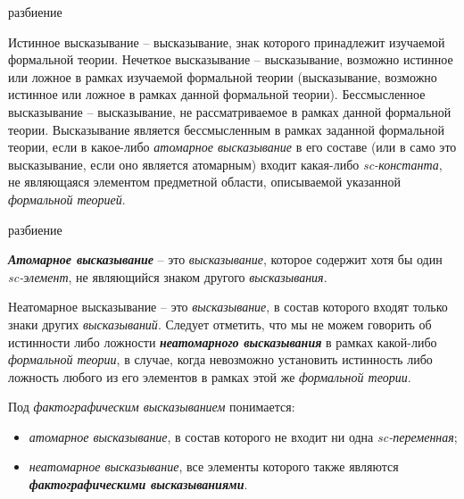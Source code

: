 \begin{SCn}
\begin{scnrelfromset}{разбиение}
\end{scnrelfromset}
\end{SCn}

Истинное высказывание -- высказывание, знак которого принадлежит изучаемой формальной теории.
Нечеткое высказывание -- высказывание, возможно истинное или ложное в рамках изучаемой формальной теории (высказывание, возможно истинное или ложное в рамках данной формальной теории).
Бессмысленное высказывание -- высказывание, не рассматриваемое в рамках данной формальной теории. Высказывание является бессмысленным в рамках заданной формальной теории, если в какое-либо \textit{атомарное высказывание} в его составе (или в само это высказывание, если оно является атомарным) входит какая-либо \textit{sc-константа}, не являющаяся элементом предметной области, описываемой указанной \textit{формальной теорией}.

\begin{SCn}
\begin{scnrelfromset}{разбиение}
\end{scnrelfromset}
\end{SCn}

\textbf{\textit{Атомарное высказывание}} -- это \textit{высказывание}, которое содержит хотя бы один \textit{sc-элемент}, не являющийся знаком другого \textit{высказывания}.

Неатомарное высказывание -- это \textit{высказывание}, в состав которого входят только знаки других \textit{высказываний}. Следует отметить, что мы не можем говорить об истинности либо ложности \textbf{\textit{неатомарного высказывания}} в рамках какой-либо \textit{формальной теории}, в случае, когда невозможно установить истинность либо ложность любого из его элементов в рамках этой же \textit{формальной теории}.

Под \textit{фактографическим высказыванием} понимается:
\begin{itemize}
	\item \textit{атомарное высказывание}, в состав которого не входит ни одна \textit{sc-переменная};
	\item \textit{неатомарное высказывание}, все элементы которого также являются \textbf{\textit{фактографическими высказываниями}}.
\end{itemize}

